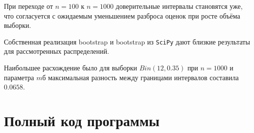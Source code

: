 \documentclass[a4paper,14pt]{extarticle}
\begin{document}
При переходе от \(n=100\) к \(n=1000\) доверительные интервалы становятся уже, что согласуется с ожидаемым уменьшением разброса оценок при росте объёма выборки.

Собственная реализация bootstrap и bootstrap из \texttt{SciPy} дают близкие результаты для  рассмотренных распределений.

Наибольшее расхождение  было   для выборки \(Bin(12,0.35)\) при \(n=1000\) и параметра \(m\)б максимальная разность между границами интервалов составила \(0.0658\).

\section{Полный код программы}


\end{document}
